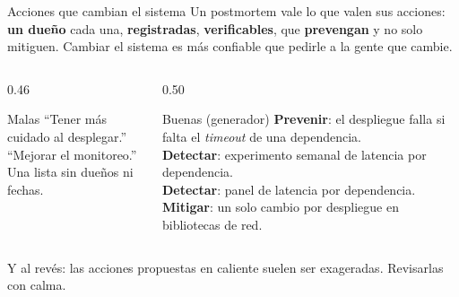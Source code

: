 \documentclass[institutional,screen,none]{ua-engineering-v6-beamer}
\begin{document}
\begin{frame}{Acciones que cambian el sistema}
Un postmortem vale lo que valen sus acciones: \textbf{un dueño} cada una, \textbf{registradas}, \textbf{verificables}, que \textbf{prevengan} y no solo mitiguen. Cambiar el sistema es más confiable que pedirle a la gente que cambie.

\pause

\begin{columns}[T,onlytextwidth]
\begin{column}{0.46\textwidth}
\begin{alertblock}{Malas}
\small
``Tener más cuidado al desplegar.''\\
``Mejorar el monitoreo.''\\
Una lista sin dueños ni fechas.
\end{alertblock}
\end{column}
\begin{column}{0.50\textwidth}
\begin{block}{Buenas (generador)}
\footnotesize
\textbf{Prevenir}: el despliegue falla si falta el \emph{timeout} de una dependencia.\\
\textbf{Detectar}: experimento semanal de latencia por dependencia.\\
\textbf{Detectar}: panel de latencia por dependencia.\\
\textbf{Mitigar}: un solo cambio por despliegue en bibliotecas de red.
\end{block}
\end{column}
\end{columns}

\pause

{\small Y al revés: las acciones propuestas en caliente suelen ser exageradas. Revisarlas con calma.}
\end{frame}
\end{document}
